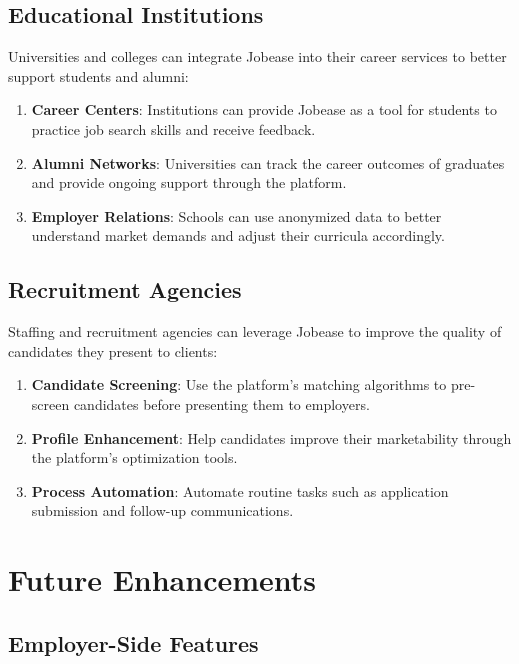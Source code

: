 \documentclass[12pt,a4paper]{report}
\begin{document}
\subsection*{Educational Institutions}

Universities and colleges can integrate Jobease into their career services to better support students and alumni:

\begin{enumerate}
    \item \textbf{Career Centers}: Institutions can provide Jobease as a tool for students to practice job search skills and receive feedback.
    \item \textbf{Alumni Networks}: Universities can track the career outcomes of graduates and provide ongoing support through the platform.
    \item \textbf{Employer Relations}: Schools can use anonymized data to better understand market demands and adjust their curricula accordingly.
\end{enumerate}

\subsection*{Recruitment Agencies}

Staffing and recruitment agencies can leverage Jobease to improve the quality of candidates they present to clients:

\begin{enumerate}
    \item \textbf{Candidate Screening}: Use the platform's matching algorithms to pre-screen candidates before presenting them to employers.
    \item \textbf{Profile Enhancement}: Help candidates improve their marketability through the platform's optimization tools.
    \item \textbf{Process Automation}: Automate routine tasks such as application submission and follow-up communications.
\end{enumerate}

\section*{Future Enhancements}

\subsection*{Employer-Side Features}
\end{document}

